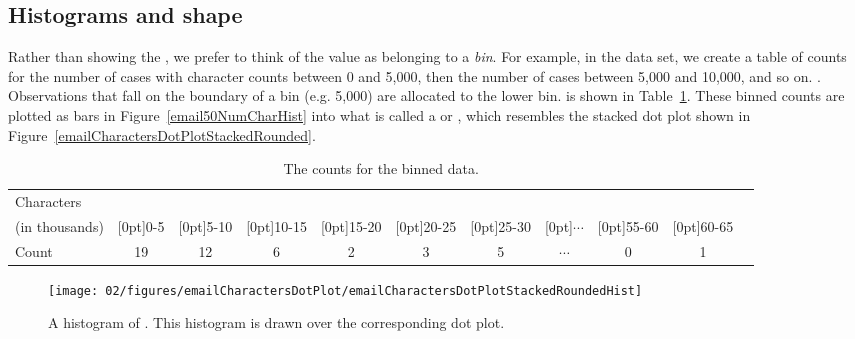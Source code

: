 \subsection{Histograms and shape}
\label{histogramsAndShape}

 Rather than showing the , we prefer to think of the value as belonging to a \emph{bin}. For example, in the  data set, we create a table of counts for the number of cases with character counts between 0 and 5,000, then the number of cases between 5,000 and 10,000, and so on. .  Observations that fall on the boundary of a bin (e.g. 5,000) are allocated to the lower bin.  is shown in Table~\ref{binnedNumCharTable}. These binned counts are plotted as bars in Figure~\ref{email50NumCharHist} into what is called a  or , which resembles the stacked dot plot shown in Figure~\ref{emailCharactersDotPlotStackedRounded}.

\begin{table}[ht]
\centering\small
\begin{tabular}{l ccc ccc ccc c}
  \hline
Characters & \\
(in thousands) & \raisebox{1.5ex}[0pt]{0-5} & \raisebox{1.5ex}[0pt]{5-10} & \raisebox{1.5ex}[0pt]{10-15} & \raisebox{1.5ex}[0pt]{15-20} & \raisebox{1.5ex}[0pt]{20-25} & \raisebox{1.5ex}[0pt]{25-30} & \raisebox{1.5ex}[0pt]{$\cdots$} & \raisebox{1.5ex}[0pt]{55-60} & \raisebox{1.5ex}[0pt]{60-65} \\
  \hline
Count & 19 & 12 & 6 & 2 & 3 & 5 & $\cdots$ & 0 & 1 \\
  \hline
\end{tabular}
\caption{The counts for the binned  data.}
\label{binnedNumCharTable}
\end{table}

\begin{figure}[bth]
   \centering
   \texttt{[image: 02/figures/emailCharactersDotPlot/emailCharactersDotPlotStackedRoundedHist]}
   \caption{A histogram of .  This histogram is drawn over the corresponding dot plot. }
   \label{emailCharactersDotPlotStackedRoundedHist}
\end{figure}

